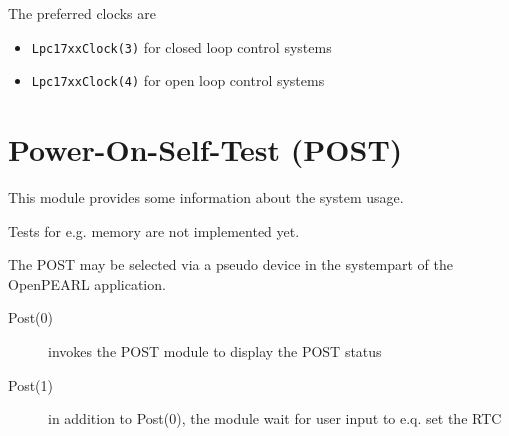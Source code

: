 The preferred clocks are 
\begin{itemize}
\item \texttt{Lpc17xxClock(3)} for closed loop control systems
\item \texttt{Lpc17xxClock(4)} for open loop control systems
\end{itemize} 


\section{Power-On-Self-Test (POST)}
This module provides some information about the system usage.

Tests for e.g. memory are not implemented yet.

The POST may be selected via a pseudo device in the systempart of the 
OpenPEARL application.

\begin{description}
\item[Post(0)] invokes the POST module to display the POST status
\item[Post(1)] in addition to Post(0), the module wait for user input
   to e.q. set the RTC
\end{description}



